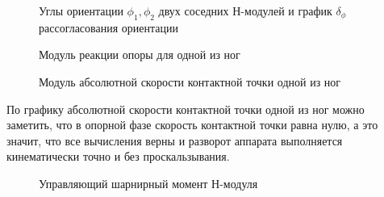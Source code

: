 \begin{figure}
\caption{Углы ориентации $\phi_1,\phi_2$  двух соседних Н-модулей и график $\delta_\phi$ рассогласования ориентации}
\end{figure}

\begin{figure}
\caption{Модуль реакции опоры для одной из ног}
\end{figure}

\begin{figure}
\caption{Модуль абсолютной скорости контактной точки одной из ног}
\end{figure}

По графику абсолютной скорости контактной точки одной из ног можно заметить, что в опорной фазе скорость контактной точки равна нулю, а это значит, что все вычисления верны и разворот аппарата выполняется кинематически точно и без проскальзывания.

\begin{figure}
\caption{Управляющий шарнирный момент Н-модуля}
\end{figure}


